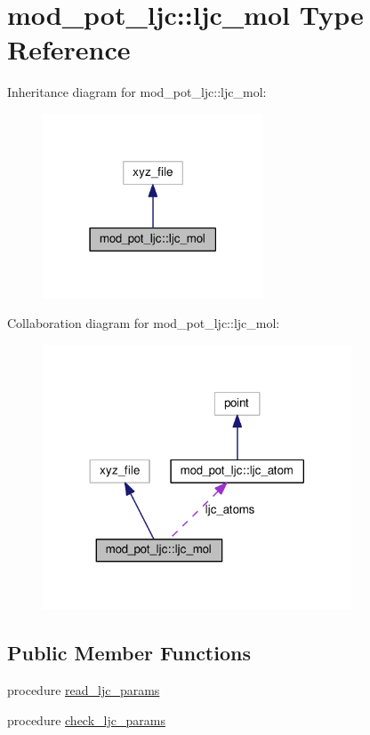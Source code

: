 \hypertarget{structmod__pot__ljc_1_1ljc__mol}{}\section{mod\+\_\+pot\+\_\+ljc\+:\+:ljc\+\_\+mol Type Reference}
\label{structmod__pot__ljc_1_1ljc__mol}


Inheritance diagram for mod\+\_\+pot\+\_\+ljc\+:\+:ljc\+\_\+mol\+:\nopagebreak
\begin{figure}[H]
\begin{center}
\leavevmode
\includegraphics[width=186pt]{structmod__pot__ljc_1_1ljc__mol__inherit__graph}
\end{center}
\end{figure}


Collaboration diagram for mod\+\_\+pot\+\_\+ljc\+:\+:ljc\+\_\+mol\+:\nopagebreak
\begin{figure}[H]
\begin{center}
\leavevmode
\includegraphics[width=260pt]{structmod__pot__ljc_1_1ljc__mol__coll__graph}
\end{center}
\end{figure}
\subsection*{Public Member Functions}
\begin{DoxyCompactItemize}
\item 
procedure \hyperlink{structmod__pot__ljc_1_1ljc__mol_ace8e9826de989061f30b31cc0e72c248}{read\+\_\+ljc\+\_\+params}
\item 
procedure \hyperlink{structmod__pot__ljc_1_1ljc__mol_af2b424674b36a1beea7d81374e3d3890}{check\+\_\+ljc\+\_\+params}
\end{DoxyCompactItemize}
